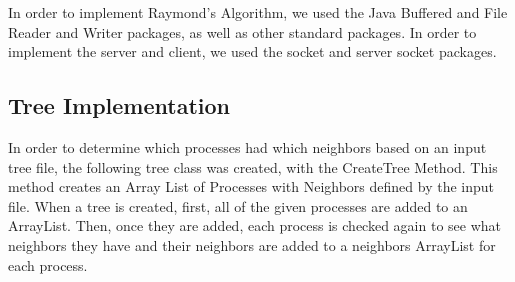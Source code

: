 \documentclass{article}
\begin{document}
\label{sec:Methodology}
In order to implement Raymond's Algorithm, we used the Java Buffered and File Reader and Writer packages, as well as other standard packages. In order to implement the server and client, we used the socket and server socket packages.

	\subsection{Tree Implementation}
	In order to determine which processes had which neighbors based on an input tree file, the following tree class was created, with the CreateTree Method. This method creates an Array List of Processes with Neighbors defined by the input file. When a tree is created,  first,  all of the given processes are added to an ArrayList. Then, once they are added, each process is checked again to see what neighbors they have and their neighbors are added to a neighbors ArrayList for each process.
\end{document}
